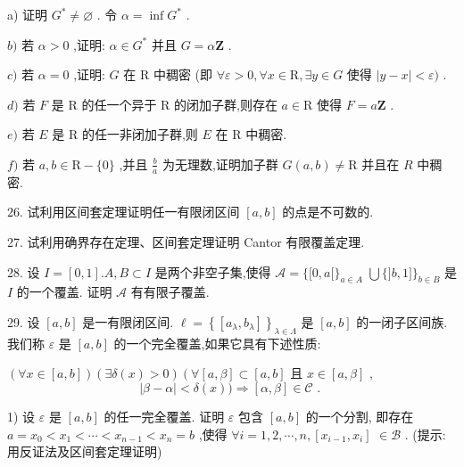 a) 证明 ${G}^{ * } \neq  \varnothing$ . 令 $\alpha  = \inf {G}^{ * }$ .

$b)$ 若 $\alpha  > 0$ ,证明: $\alpha  \in  {G}^{ * }$ 并且 $G = \alpha \mathbf{Z}$ .

$c)$ 若 $\alpha  = 0$ ,证明: $G$ 在 $\mathrm{R}$ 中稠密 (即 $\forall \varepsilon  > 0,\forall x \in  \mathrm{R},\exists y \in  G$ 使得 $\left| {y - x}\right|  < \varepsilon )$ .

$d)$ 若 $F$ 是 $\mathrm{R}$ 的任一个异于 $\mathrm{R}$ 的闭加子群,则存在 $a \in  \mathrm{R}$ 使得 $F = a\mathbf{Z}$ .

$e)$ 若 $E$ 是 $\mathrm{R}$ 的任一非闭加子群,则 $E$ 在 $\mathrm{R}$ 中稠密.

$f)$ 若 $a,b \in  \mathrm{R} - \{ 0\}$ ,并且 $\frac{b}{a}$ 为无理数,证明加子群 $G\left( {a,b}\right)  \neq  \mathrm{R}$ 并且在 $R$ 中稠密.

26. 试利用区间套定理证明任一有限闭区间 $\left\lbrack  {a,b}\right\rbrack$ 的点是不可数的.

27. 试利用确界存在定理、区间套定理证明 Cantor 有限覆盖定理.

28. 设 $I = \left\lbrack  {0,1}\right\rbrack  .A,B \subset  I$ 是两个非空子集,使得 $\mathcal{A} = \{ \lbrack 0,a\lbrack {\} }_{a \in  A}$  $\bigcup \{ \rbrack b,1\rbrack {\} }_{b \in  B}$ 是 $I$ 的一个覆盖. 证明 $\mathcal{A}$ 有有限子覆盖.

29. 设 $\left\lbrack  {a,b}\right\rbrack$ 是一有限闭区间. $\ell  = {\left\{  \left\lbrack  {a}_{\lambda },{b}_{\lambda }\right\rbrack  \right\}  }_{\lambda  \in  \Lambda }$ 是 $\left\lbrack  {a,b}\right\rbrack$ 的一闭子区间族. 我们称 $\varepsilon$ 是 $\left\lbrack  {a,b}\right\rbrack$ 的一个完全覆盖,如果它具有下述性质:

$\left( {\forall x \in  \left\lbrack  {a,b}\right\rbrack  }\right) \left( {\exists \delta \left( x\right)  > 0}\right) \left( {\forall \left\lbrack  {a,\beta }\right\rbrack   \subset  \left\lbrack  {a,b}\right\rbrack  }\right.$ 且 $x \in  \left\lbrack  {a,\beta }\right\rbrack$ ,
$$\left| {\beta  - \alpha }\right|  < \delta \left( x\right) ) \Rightarrow  \left\lbrack  {\alpha ,\beta }\right\rbrack   \in  \mathcal{C}\text{ . }$$

1) 设 $\varepsilon$ 是 $\left\lbrack  {a,b}\right\rbrack$ 的任一完全覆盖. 证明 $\varepsilon$ 包含 $\left\lbrack  {a,b}\right\rbrack$ 的一个分割, 即存在 $a = {x}_{0} < {x}_{1} < \cdots  < {x}_{n - 1} < {x}_{n} = b$ ,使得 $\forall i = 1,2,\cdots ,n,\left\lbrack  {{x}_{i - 1},{x}_{i}}\right\rbrack$  $\in  \mathcal{B}$ . (提示: 用反证法及区间套定理证明)

